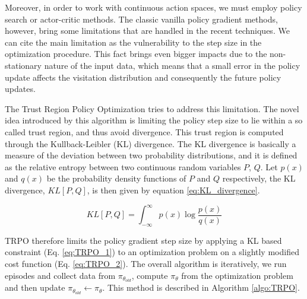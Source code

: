 Moreover, in order to work with continuous action spaces, we must employ policy search or actor-critic methods. The classic vanilla policy gradient methods, however, bring some limitations that are handled in the recent techniques. We can cite the main limitation as the vulnerability to the step size in the optimization procedure. This fact brings even bigger impacts due to the non-stationary nature of the input data, which means that a small error in the policy update affects the visitation distribution and consequently the future policy updates.


The Trust Region Policy Optimization tries to address this limitation. The novel idea introduced by this algorithm is limiting the policy step size to lie within a so called trust region, and thus avoid divergence. This trust region is computed through the Kullback-Leibler (KL) divergence. The KL divergence is basically a measure of the deviation between two probability distributions, and it is defined as the relative entropy between two continuous random variables $P$, $Q$. Let $p(x)$ and $q(x)$ be the probability density functions of $P$ and $Q$ respectively, the KL divergence, $KL[P,Q]$, is then given by equation \ref{eq:KL_divergence}.


\begin{equation}
KL[P,Q] = \int_{-\infty}^{\infty}{p(x)\log{\frac{p(x)}{q(x)}}}
\label{eq:KL_divergence}
\end{equation}

TRPO therefore limits the policy gradient step size by applying a KL based constraint (Eq. \ref{eq:TRPO_1}) to an optimization problem on a slightly modified cost function (Eq. \ref{eq:TRPO_2}). The overall algorithm is iteratively, we run episodes and collect data from $\pi_{\theta_{old}}$, compute $\pi_{\theta}$ from the optimization problem and then update $\pi_{\theta_{old}} \leftarrow \pi_{\theta}$. This method is described in Algorithm \ref{algo:TRPO}.

